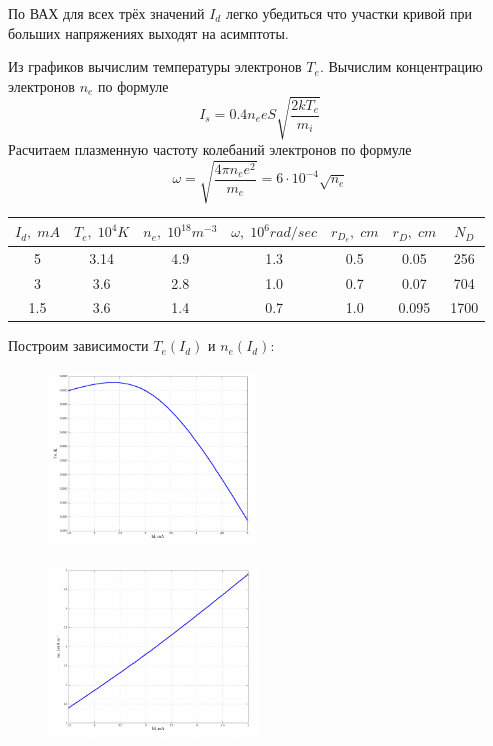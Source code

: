 \documentclass[11pt]{article}
\begin{document}
По ВАХ для всех трёх значений \(I_d\) легко убедиться что участки кривой при больших напряжениях
выходят на асимптоты.

Из графиков вычислим температуры электронов \(T_e\).
Вычислим концентрацию электронов \(n_e\) по формуле
\[ I_s = 0.4n_eeS\sqrt{\frac{2kT_e}{m_i}} \]
Расчитаем плазменную частоту колебаний электронов по формуле
\[ \omega = \sqrt{\frac{4\pi n_e e^2}{m_e}} = 6\cdot 10^{-4} \sqrt{n_e}  \]



\begin{table}[H]
    \centering
    \begin{tabular}{|c|c|c|c|c|c|c|}
    \hline
    \(I_d,\; mA\)&\(T_e,\; 10^{4}K\) & \(n_e,\; 10^{18}m^{-3}\) & \(\omega,\; 10^{6}rad/sec\) & \(r_{D_e},\; cm\) & \(r_D,\; cm\) & \(N_D\) \\\hline
    5   &  3.14 & 4.9  & 1.3 &  0.5    &   0.05     &  256  \\\hline
    3   &  3.6  & 2.8  & 1.0 &  0.7    &   0.07     &  704  \\\hline
    1.5 &  3.6  & 1.4  & 0.7 &  1.0    &   0.095    &  1700 \\\hline
    \end{tabular}
\end{table}

Построим зависимости \(T_e(I_d)\) и \(n_e(I_d)\):

\begin{figure}[H]
    \centering
    \includegraphics[width=0.5\textwidth]{T-I.png}
\end{figure}

\begin{figure}[H]
    \centering
    \includegraphics[width=0.5\textwidth]{n-I.png}
\end{figure}
\end{document}
